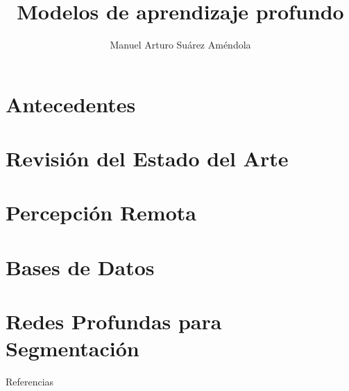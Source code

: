 \documentclass[11pt]{beamer}
\title[Seminario de UAM]
{Modelos de aprendizaje profundo}
\author[Suárez, M.A.]{Manuel Arturo Suárez Améndola}
\begin{document}


\section{Antecedentes}


\section{Revisión del Estado del Arte}


\section{Percepción Remota}


\section{Bases de Datos}


\section{Redes Profundas para Segmentación}


%

\nocite{*}
\begin{frame}[allowframebreaks]{Referencias}


\end{frame}
\end{document}
